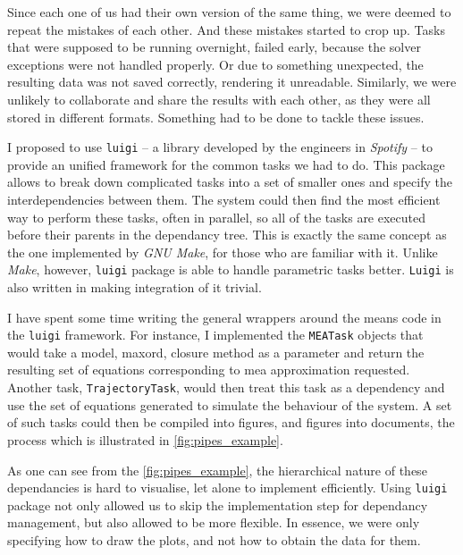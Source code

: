 Since each one of us had their own version of the same thing, we were deemed to repeat the mistakes of each other. And these mistakes started to crop up. 
Tasks that were supposed to be running overnight, failed early, because the solver exceptions were not handled properly. 
Or due to something unexpected, the resulting data was not saved correctly, rendering it unreadable.
Similarly, we were unlikely to collaborate and share the results with each other, as they were all stored in different formats.
Something had to be done to tackle these issues.

I proposed to use \verb"luigi"\cite{_luigi_????} -- a \python{} library developed by the engineers in \emph{Spotify} -- to provide an unified framework for the common tasks we had to do. 
This package allows to break down complicated tasks into a set of smaller ones and specify the interdependencies between them.
The system could then find the most efficient way to perform these  tasks, often in parallel, so all of the tasks are executed before their parents in the dependancy tree. 
This is exactly the same concept as the one implemented by \emph{GNU Make}\cite{gnumake}, for those who are familiar with it. Unlike \emph{Make}, however, \verb"luigi" package is able to handle parametric tasks better. \verb"Luigi" is also written in \py{} making integration of it trivial.

I have spent some time writing the general wrappers around the means code in the \verb"luigi" framework. 
For instance, I implemented the \verb"MEATask" objects that would take a model, \gls{maxord}, closure method as a parameter and return the resulting set of equations corresponding to \gls{mea} approximation requested. 
Another task, \verb"TrajectoryTask", would then treat this task as a dependency and use the set of equations generated to simulate the behaviour of the system. 
A set of such tasks could then be compiled into figures, and figures into documents, the process which is illustrated in \autoref{fig:pipes_example}.

As one can see from the \autoref{fig:pipes_example}, the hierarchical nature of these dependancies is hard to visualise, let alone to implement efficiently.
Using {\tt luigi} package not only allowed us to skip the implementation step for dependancy management, but also allowed to be more flexible. In essence, we were only specifying how to draw the plots, and not how to obtain the data for them.

